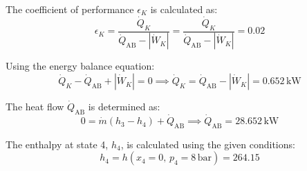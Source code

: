 The coefficient of performance \( \epsilon_K \) is calculated as:  
\[
\epsilon_K = \frac{\dot{Q}_K}{\dot{Q}_{\text{AB}} - |\dot{W}_K|} = \frac{\dot{Q}_K}{\dot{Q}_{\text{AB}} - |\dot{W}_K|} = 0.02
\]

Using the energy balance equation:  
\[
\dot{Q}_K - \dot{Q}_{\text{AB}} + |\dot{W}_K| = 0 \implies \dot{Q}_K = \dot{Q}_{\text{AB}} - |\dot{W}_K| = 0.652 \, \text{kW}
\]

The heat flow \( \dot{Q}_{\text{AB}} \) is determined as:  
\[
0 = \dot{m} \left( h_3 - h_4 \right) + \dot{Q}_{\text{AB}} \implies \dot{Q}_{\text{AB}} = 28.652 \, \text{kW}
\]

The enthalpy at state 4, \( h_4 \), is calculated using the given conditions:  
\[
h_4 = h \left( x_4 = 0, \, p_4 = 8 \, \text{bar} \right) = 264.15
\]